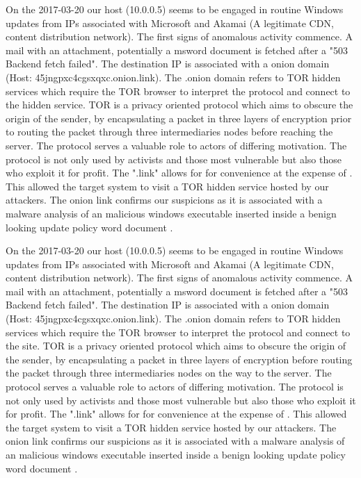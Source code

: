 \documentclass[11pt]{diazessay} %
\begin{document}
On the 2017-03-20 our host (10.0.0.5) seems to be engaged in routine Windows updates from IPs associated with Microsoft and Akamai (A legitimate CDN, content distribution network). The first signs of anomalous activity commence. A mail with an attachment, potentially a msword document is fetched after a "503 Backend fetch failed". The destination IP is associated with a onion domain (Host: 45jngpxc4cgsxqxc.onion.link). The .onion domain refers to TOR hidden services which require the TOR browser to interpret the protocol and connect to the hidden service. TOR is a privacy oriented protocol which aims to obscure the origin of the sender, by encapsulating a packet in three layers of encryption prior to routing the packet through three intermediaries nodes before reaching the server. The protocol serves a valuable role to actors of differing motivation. The protocol is not only used by activists and those most vulnerable but also those who exploit it for profit. The ".link" allows for for convenience at the expense of \cite{onionlink}. This allowed the target system to visit a TOR hidden service hosted by our attackers. The onion link confirms our suspicions as it is associated with a malware analysis of an malicious windows executable inserted inside a benign looking update policy word document \cite{hybrid}.

On the 2017-03-20 our host (10.0.0.5) seems to be engaged in routine Windows updates from IPs associated with Microsoft and Akamai (A legitimate CDN, content distribution network). The first signs of anomalous activity commence. A mail with an attachment, potentially a msword document is fetched after a "503 Backend fetch failed". The destination IP is associated with a onion domain (Host: 45jngpxc4cgsxqxc.onion.link). The .onion domain refers to TOR hidden services which require the TOR browser to interpret the protocol and connect to the site. TOR is a privacy oriented protocol which aims to obscure the origin of the sender, by encapsulating a packet in three layers of encryption before routing the packet through three intermediaries nodes on the way to the server. The protocol serves a valuable role to actors of differing motivation. The protocol is not only used by activists and those most vulnerable but also those who exploit it for profit. The ".link" allows for for convenience at the expense of \cite{onionlink}. This allowed the target system to visit a TOR hidden service hosted by our attackers. The onion link confirms our suspicions as it is associated with a malware analysis of an malicious windows executable inserted inside a benign looking update policy word document \cite{hybrid}.
\end{document}
